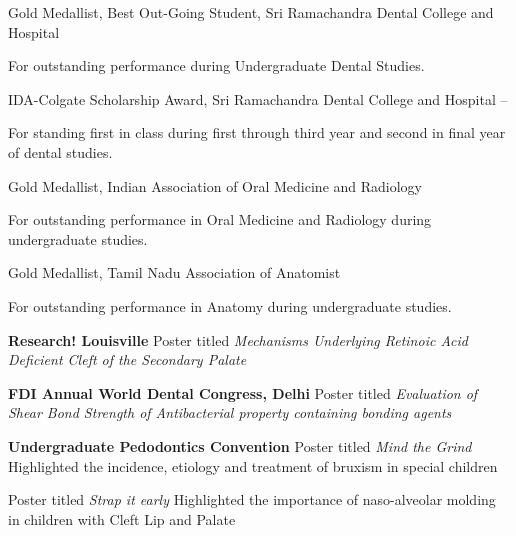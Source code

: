 \documentclass[letterpaper,MMMyyyy,nonstopmode]{simpleresumecv}
\begin{document}
\begin{Body}
\Gap
\BulletItem
Gold Medallist, Best Out-Going Student,
Sri Ramachandra Dental College and Hospital
\hfill
{} 
\begin{Detail}
\Item
For outstanding performance during Undergraduate Dental Studies.
\end{Detail}

\Gap
\BulletItem
IDA-Colgate Scholarship Award,
Sri Ramachandra Dental College and Hospital
\hfill
{} --
\begin{Detail}
\Item
For standing first in class during first through third year and second in final year of dental studies.
\end{Detail}

\Gap
\BulletItem
Gold Medallist,
{Indian Association of Oral Medicine and Radiology}
\hfill
{}
\begin{Detail}
\Item
For outstanding performance in Oral Medicine and Radiology during undergraduate studies.
\end{Detail}

\Gap
\BulletItem
Gold Medallist,
Tamil Nadu Association of Anatomist
\hfill
{}
\begin{Detail}
\Item
For outstanding performance in Anatomy during undergraduate studies.
\end{Detail}


\Entry
\textbf{Research! Louisville}
\BulletItem
Poster titled \textit{Mechanisms Underlying Retinoic Acid Deficient Cleft of the Secondary Palate}
\hfill
{}

\BigGap

\Entry
\textbf{FDI Annual World Dental Congress, Delhi}
\BulletItem
Poster titled \textit{Evaluation of Shear Bond Strength of Antibacterial property containing bonding agents}
\hfill
{}

\BigGap
\Entry
\textbf{Undergraduate Pedodontics Convention}
\BulletItem
Poster titled \textit{Mind the Grind} 
\hfill
{}
\newline
Highlighted the incidence, etiology and treatment of bruxism in special children

\Gap
\BulletItem
Poster titled \textit{Strap it early} 
\hfill
{}
\newline
Highlighted the importance of naso-alveolar molding in children with Cleft Lip and Palate


\end{Body}
\end{document}
